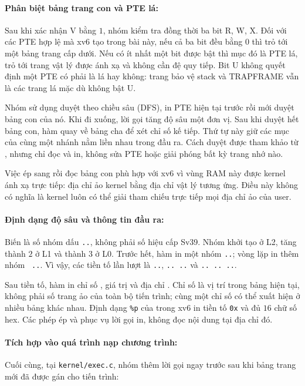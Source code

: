 \documentclass[a4paper]{article}
\begin{document}
\paragraph*{Phân biệt bảng trang con và PTE lá:}
Sau khi xác nhận V bằng $1$, nhóm kiểm tra đồng thời ba bit R, W, X.
Đối với các PTE hợp lệ mà xv6 tạo trong bài này, nếu cả ba bit đều
bằng $0$ thì  trỏ tới một bảng trang cấp dưới. Nếu có ít nhất
một bit được bật thì mục đó là PTE lá, trỏ tới trang vật lý được ánh
xạ và không cần đệ quy tiếp. Bit U không quyết định một PTE có phải
là lá hay không: trang bảo vệ stack và TRAPFRAME vẫn là các trang lá
mặc dù không bật U.

Nhóm sử dụng duyệt theo chiều sâu (DFS), in PTE hiện tại trước rồi
mới duyệt bảng con của nó. Khi đi xuống, lời gọi
 tăng độ sâu một đơn vị.
Sau khi duyệt hết bảng con, hàm quay về bảng cha để xét chỉ số kế
tiếp. Thứ tự này giữ các mục của cùng một nhánh nằm liền nhau trong
đầu ra. Cách duyệt được tham khảo từ , nhưng
 chỉ đọc và in, không sửa PTE hoặc giải phóng
bất kỳ trang nhớ nào.

Việc ép  sang  rồi đọc bảng con phù hợp
với xv6 vì vùng RAM này được kernel ánh xạ trực tiếp: địa chỉ ảo
kernel bằng địa chỉ vật lý tương ứng. Điều này không có nghĩa là
kernel luôn có thể giải tham chiếu trực tiếp mọi địa chỉ ảo của user.

\paragraph*{Định dạng độ sâu và thông tin đầu ra:}
Biến  là số nhóm dấu \texttt{..}, không phải số hiệu cấp
Sv39. Nhóm khởi tạo  ở L2, tăng thành $2$ ở L1 và
thành $3$ ở L0. Trước hết, hàm in một nhóm \texttt{..}; vòng lặp
 in thêm  nhóm
\texttt{ ..}. Vì vậy, các tiền tố lần lượt là \texttt{..},
\texttt{.. ..} và \texttt{.. .. ..}.

Sau tiền tố, hàm in chỉ số , giá trị  và địa chỉ
. Chỉ số  là vị trí trong bảng hiện tại, không phải
số trang ảo của toàn bộ tiến trình; cùng một chỉ số có thể xuất hiện
ở nhiều bảng khác nhau. Định dạng \texttt{\%p} của 
trong xv6 in tiền tố \texttt{0x} và đủ $16$ chữ số hex. Các phép ép
 và  phục vụ lời gọi in, không đọc
nội dung tại địa chỉ đó.


\paragraph*{Tích hợp vào quá trình nạp chương trình:}
Cuối cùng, tại \texttt{kernel/exec.c}, nhóm thêm lời gọi ngay trước
 sau khi bảng trang mới đã được gán cho tiến trình:
\end{document}
